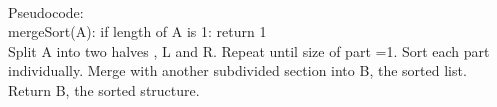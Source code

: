 \documentclass[twocolumn]{article}
\begin{document}
\\
Pseudocode:\\
mergeSort(A):
\hspace*{0.5in} if length of A is 1: return 1\\
\hspace*{0.5in} Split A into two halves , L and R. Repeat until size of part =1.
\hspace*{0.5in} Sort each part individually. Merge with another subdivided section into B, the sorted list. 
\hspace*{0.5} Return B, the sorted structure.\\
\end{document}

